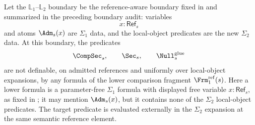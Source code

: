 \begin{theorem}\label{thm:pointwise-irreducibility}
Let the $\mathbb L_1$--$\mathbb L_2$ boundary be the reference-aware boundary fixed in  and summarized in the preceding boundary audit: variables
\[
x:\mathsf{Ref}_s
\]
and atoms $\Adm_s(x)$ are $\Sigma_1$ data, and the local-object predicates are the new $\Sigma_2$ data. At this boundary, the predicates
\[
\CompSec_s,\qquad \Sec_s,\qquad \Null_s^{\mathrm{glue}}
\]
are not definable, on admitted references and uniformly over local-object expansions, by any formula of the lower comparison fragment $\Frm_1^{\mathrm{ref}}(s)$. Here a lower formula is a parameter-free $\Sigma_1$ formula with displayed free variable $x:\mathsf{Ref}_s$, as fixed in ; it may mention $\Adm_s(x)$, but it contains none of the $\Sigma_2$ local-object predicates. The target predicate is evaluated externally in the $\Sigma_2$ expansion at the same semantic reference element.


\end{theorem}
